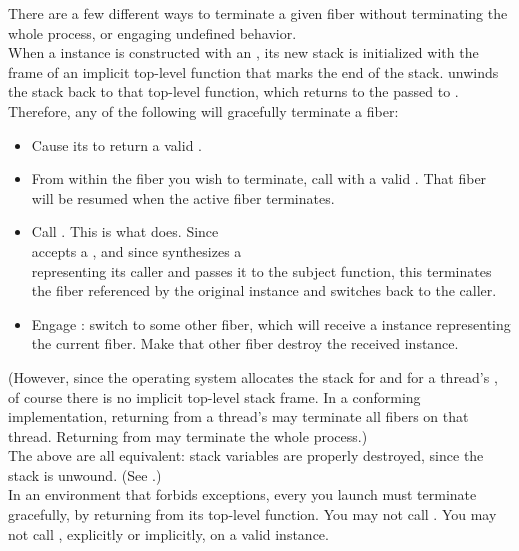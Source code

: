 
There are a few different ways to terminate a given fiber without
terminating the whole process, or engaging undefined behavior.\\

When a \fiber instance is constructed with an \entryfn, its new stack is
initialized with the frame of an implicit top-level function that marks the
end of the stack. \unwindfib unwinds the stack back to
that top-level function, which returns to the \fiber passed to \unwindfib.\\

Therefore, any of the following will gracefully terminate a fiber:

\begin{itemize}
    \item Cause its \entryfn to return a valid \fiber.
    \item From within the fiber you wish to terminate, call \unwindfib with a
          valid \fiber. That fiber will be resumed
          when the active fiber terminates.
    \item Call . This is what \dtor
          does. Since\\\unwindfib accepts a \fiber, and since \resumewith
          synthesizes a\\\fiber representing its caller and passes it to the
          subject function, this terminates the fiber referenced by the
          original \fiber instance and switches back to the caller.
    \item Engage \dtor: switch to some other fiber, which will
          receive a \fiber instance representing the current fiber. Make that
          other fiber destroy the received \fiber instance.
\end{itemize}

(However, since the operating system allocates the stack for \main and for a
thread's \entryfn, of course there is no implicit top-level stack frame. In
a conforming implementation, returning from a thread's \entryfn may
terminate all fibers on that thread. Returning from \main may terminate the
whole process.)\\

The above are all equivalent: stack variables are properly destroyed, since
the stack is unwound. (See .)\\

In an environment that forbids exceptions, every \fiber you launch must
terminate gracefully, by returning from its top-level function. You may not
call \unwindfib. You may not call \dtor, explicitly or implicitly, on a
valid \fiber instance.\\

